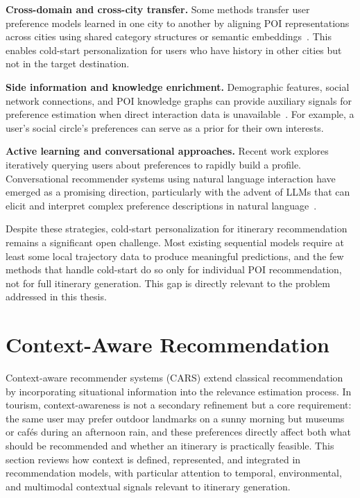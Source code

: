 \textbf{Cross-domain and cross-city transfer.} Some methods transfer user preference models learned in one city to another by aligning POI representations across cities using shared category structures or semantic embeddings~\cite{yin2015crosscity}. This enables cold-start personalization for users who have history in other cities but not in the target destination.

\textbf{Side information and knowledge enrichment.} Demographic features, social network connections, and POI knowledge graphs can provide auxiliary signals for preference estimation when direct interaction data is unavailable~\cite{guo2022kgsurvey}. For example, a user's social circle's preferences can serve as a prior for their own interests.

\textbf{Active learning and conversational approaches.} Recent work explores iteratively querying users about preferences to rapidly build a profile. Conversational recommender systems using natural language interaction have emerged as a promising direction, particularly with the advent of LLMs that can elicit and interpret complex preference descriptions in natural language~\cite{jannach2021conversational}.

Despite these strategies, cold-start personalization for itinerary recommendation remains a significant open challenge. Most existing sequential models require at least some local trajectory data to produce meaningful predictions, and the few methods that handle cold-start do so only for individual POI recommendation, not for full itinerary generation. This gap is directly relevant to the problem addressed in this thesis.

\section{Context-Aware Recommendation}
\label{sec:sota-cars}

Context-aware recommender systems (CARS) extend classical recommendation by incorporating situational information into the relevance estimation process. In tourism, context-awareness is not a secondary refinement but a core requirement: the same user may prefer outdoor landmarks on a sunny morning but museums or cafés during an afternoon rain, and these preferences directly affect both what should be recommended and whether an itinerary is practically feasible. This section reviews how context is defined, represented, and integrated in recommendation models, with particular attention to temporal, environmental, and multimodal contextual signals relevant to itinerary generation.

